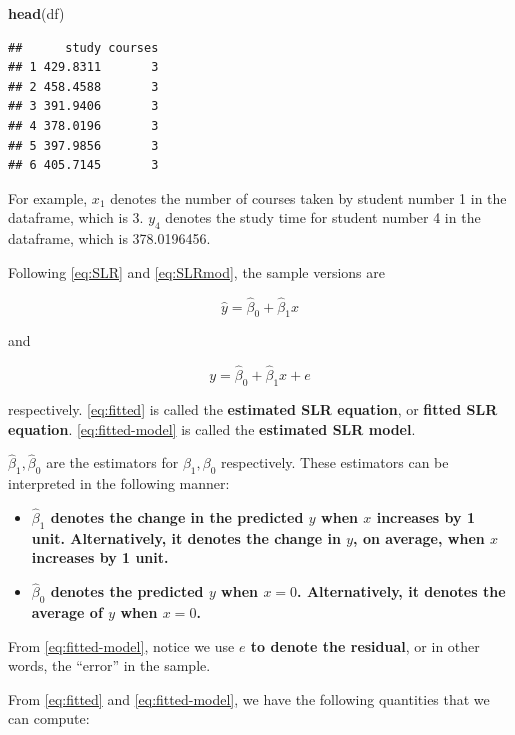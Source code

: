 \documentclass[
]{book}
\newenvironment{Shaded}{\begin{snugshade}}{\end{snugshade}}
\newcommand{\FunctionTok}[1]{\textcolor[rgb]{0.13,0.29,0.53}{\textbf{#1}}}
\newcommand{\NormalTok}[1]{#1}
\providecommand{\tightlist}{%
  \setlength{\itemsep}{0pt}\setlength{\parskip}{0pt}}
\begin{document}
\begin{Shaded}
\begin{Highlighting}[]
\FunctionTok{head}\NormalTok{(df)}
\end{Highlighting}
\end{Shaded}

\begin{verbatim}
##      study courses
## 1 429.8311       3
## 2 458.4588       3
## 3 391.9406       3
## 4 378.0196       3
## 5 397.9856       3
## 6 405.7145       3
\end{verbatim}

For example, \(x_1\) denotes the number of courses taken by student number 1 in the dataframe, which is 3. \(y_4\) denotes the study time for student number 4 in the dataframe, which is 378.0196456.

Following \eqref{eq:SLR} and \eqref{eq:SLRmod}, the sample versions are

\begin{equation} 
\hat{y}=\hat{\beta}_0+\hat{\beta}_1 x
\label{eq:fitted}
\end{equation}

and

\begin{equation} 
y=\hat{\beta}_0+\hat{\beta}_1 x + e
\label{eq:fitted-model}
\end{equation}

respectively. \eqref{eq:fitted} is called the \textbf{estimated SLR equation}, or \textbf{fitted SLR equation}. \eqref{eq:fitted-model} is called the \textbf{estimated SLR model}.

\(\hat{\beta}_1,\hat{\beta}_0\) are the estimators for \(\beta_1,\beta_0\) respectively. These estimators can be interpreted in the following manner:

\begin{itemize}
\tightlist
\item
  \textbf{\(\hat{\beta}_1\) denotes the change in the predicted \(y\) when \(x\) increases by 1 unit. Alternatively, it denotes the change in \(y\), on average, when \(x\) increases by 1 unit.}
\item
  \textbf{\(\hat{\beta}_0\) denotes the predicted \(y\) when \(x=0\). Alternatively, it denotes the average of \(y\) when \(x=0\).}
\end{itemize}

From \eqref{eq:fitted-model}, notice we use \textbf{\(e\) to denote the residual}, or in other words, the ``error'' in the sample.

From \eqref{eq:fitted} and \eqref{eq:fitted-model}, we have the following quantities that we can compute:
\end{document}
